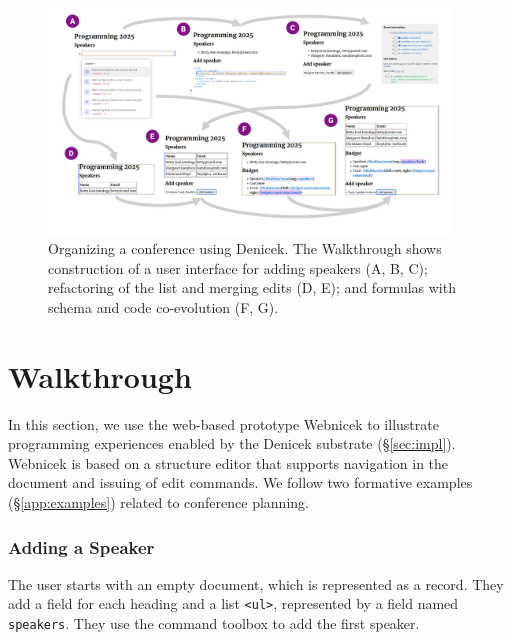 \documentclass[sigconf,anonymous,screen]{acmart}
\newcommand*\circled[1]{\textnormal{\footnotesize\sffamily\bfseries\protect\tikz[baseline=(char.base)]{
  \node[shape=circle,fill=black,text=white,draw,inner sep=1pt] (char) {#1};}}}
\begin{document}
\begin{figure}[t]
\vspace{-0.5em}
\includegraphics[width=0.95\textwidth,clip,trim=1cm 1cm 1cm 0.5cm]{fig/walkthrough.pdf}
\vspace{-1em}
\caption{Organizing a conference using Denicek. The Walkthrough shows construction of a user
  interface for adding speakers (A, B, C); refactoring of the list and merging edits (D, E); and
  formulas with schema and code co-evolution (F, G).}
\label{fig:walkthrough}
\end{figure}

\newpage


\section{Walkthrough}
\label{sec:walk}

In this section, we use the web-based prototype Webnicek to illustrate programming
experiences enabled by the Denicek substrate (\S\ref{sec:impl}). Webnicek is based on a structure
editor that supports navigation in the document and issuing of edit commands. We follow two
formative examples (\S\ref{app:examples}) related to conference planning.

\subsubsection*{\circled{A} Adding a Speaker}
The user starts with an empty document, which is represented as a record. They add a field for
each heading and a list {\small\Verb_<ul>_}, represented by a field named {\small\Verb_speakers_}. They use the command
toolbox to add the first speaker.
\end{document}
